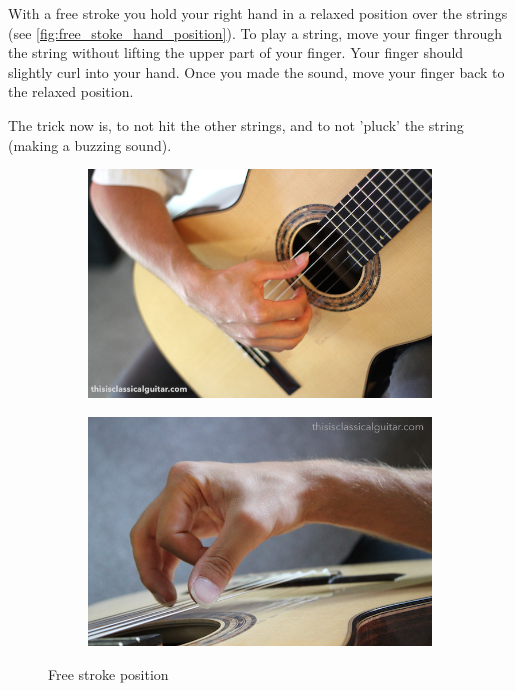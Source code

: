 With a free stroke you hold your right hand in a relaxed position over the strings (see \autoref{fig:free_stoke_hand_position}). To play a string, move your finger through the string without lifting the upper part of your finger. Your finger should slightly curl into your hand. Once you made the sound, move your finger back to the relaxed position.

The trick now is, to not hit the other strings, and to not 'pluck' the string (making a buzzing sound).

\begin{figure}[h]
  \begin{subfigure}[b]{0.45\textwidth}
    \includegraphics[width=\textwidth]{../../Images/Bradford-right-hand-close-2016.jpg}
    \caption{}
    \label{fig:}
  \end{subfigure}
  \hfill
  \begin{subfigure}[b]{0.45\textwidth}
    \includegraphics[width=\textwidth]{../../Images/brad-right-stroke-2016.jpg}
    \caption{}
    \label{fig:}
  \end{subfigure}
  \caption{Free stroke position \cite{FreeStrokePositionBradlyWerner}}
  \label{fig:free_stoke_hand_position}
\end{figure}

